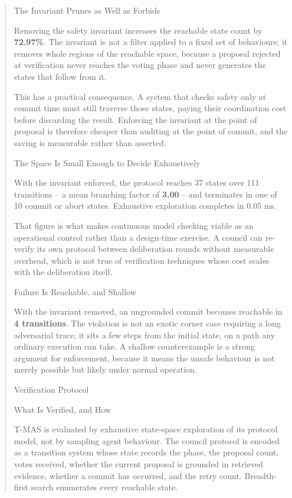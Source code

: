 \documentclass[10pt,twocolumn,letterpaper]{article}
\begin{document}
\begin{quote}
{ The Invariant Prunes as Well as Forbids

Removing the safety invariant increases the reachable state count by
\textbf{72.97\%}. The invariant is not a filter
applied to a fixed set of behaviours; it removes whole regions of the reachable
space, because a proposal rejected at verification never reaches the voting phase
and never generates the states that follow from it.

This has a practical consequence. A system that checks safety only at commit time
must still traverse those states, paying their coordination cost before discarding
the result. Enforcing the invariant at the point of proposal is therefore cheaper
than auditing at the point of commit, and the saving is measurable rather than
asserted.

 The Space Is Small Enough to Decide Exhaustively

With the invariant enforced, the protocol reaches
37 states over 111
transitions -- a mean branching factor of
\textbf{3.00} -- and terminates in one of
10 commit or abort states. Exhaustive exploration
completes in 0.05 ms.

That figure is what makes continuous model checking viable as an operational
control rather than a design-time exercise. A council can re-verify its own
protocol between deliberation rounds without measurable overhead, which is not true
of verification techniques whose cost scales with the deliberation itself.

 Failure Is Reachable, and Shallow

With the invariant removed, an ungrounded commit becomes reachable in
\textbf{4 transitions}. The violation is
not an exotic corner case requiring a long adversarial trace; it sits a few steps
from the initial state, on a path any ordinary execution can take. A shallow
counterexample is a strong argument for enforcement, because it means the unsafe
behaviour is not merely possible but likely under normal operation.



 Verification Protocol

 What Is Verified, and How

T-MAS is evaluated by exhaustive state-space exploration of its protocol model, not by sampling agent behaviour. The council protocol is encoded as a transition system whose state records the phase, the proposal count, votes received, whether the current proposal is grounded in retrieved evidence, whether a commit has occurred, and the retry count. Breadth-first search enumerates every reachable state.

}
\end{quote}
\end{document}
